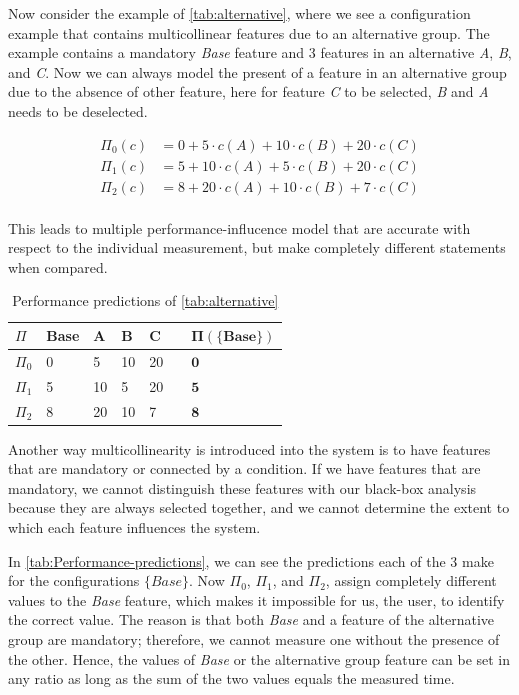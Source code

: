 Now consider the example of \autoref{tab:alternative}, where we see a configuration example that contains multicollinear features due to an alternative group.
The example contains a mandatory \textit{Base} feature and 3 features in an alternative \textit{A}, \textit{B}, and \textit{C}.
Now we can always model the present of a feature in an alternative group due to the absence of other feature, here for feature \textit{C} to be selected, 
\textit{B} and \textit{A} needs to be deselected.

\begin{align*}
    \Pi_0(c) &= 0 + 5 \cdot c(A) + 10\cdot c(B) + 20\cdot c(C) \\
    \Pi_1(c) &= 5 + 10 \cdot c(A) + 5\cdot c(B) + 20\cdot c(C) \\
    \Pi_2(c) &= 8 + 20 \cdot c(A) + 10\cdot c(B) + 7\cdot c(C) \\
\end{align*}

This leads to multiple performance-influcence model that are accurate with respect to the individual measurement, 
but make completely different statements when compared.

\begin{table}[h]
    \centering
    \begin{tabular}{lllllll}
    \hline
    $\Pi$ & Base & A & B & C   & &  $\bm{\Pi(\{Base\})}$   \\ \hline
    $\Pi_0$ & 0 & 5  & 10 & 20 & &  $\mathbf{0}$         \\
    $\Pi_1$ & 5 & 10 & 5  & 20 & &  $\mathbf{5}$         \\  
    $\Pi_2$ & 8 & 20 & 10 & 7  & &  $\mathbf{8}$        \\\hline
    \end{tabular}
    \caption{Performance predictions of \autoref{tab:alternative}}\label{tab:Performance-predictions}
\end{table}

Another way multicollinearity is introduced into the system is to have features that are mandatory or connected by a condition. 
If we have features that are mandatory, we cannot distinguish these features with our black-box analysis because they are always selected
together, and we cannot determine the extent to which each feature influences the system. \cite{Multicollinearity}

In \autoref{tab:Performance-predictions}, we can see the predictions each of the 3 \perfInfluenceModel make for the configurations $\{Base\}$. 
Now $\Pi_0$, $\Pi_1$, and $\Pi_2$, assign completely different values to the \textit{Base} feature, which makes it impossible for us, the user,
to identify the correct value. The reason is that both \textit{Base} and a feature of the alternative group are mandatory; 
therefore, we cannot measure one without the presence of the other. 
Hence, the values of \textit{Base} or the alternative group feature can be set in any ratio as long as the sum of the two values equals the measured time.

